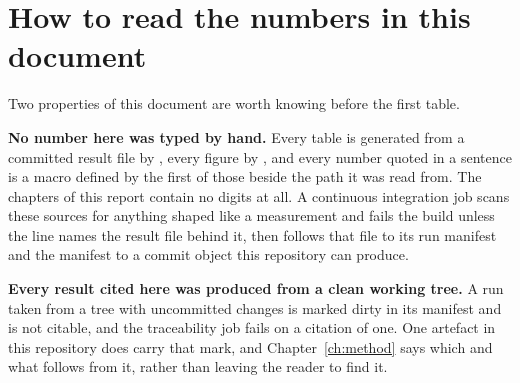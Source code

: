 \section{How to read the numbers in this document}

\syntheticnote

Two properties of this document are worth knowing before the first table.

\textbf{No number here was typed by hand.} Every table is generated from a
committed result file by , every figure by
, and every number quoted in a sentence
is a macro defined by the first of those beside the path it was read from. The
chapters of this report contain no digits at all. A continuous integration job
scans these sources for anything shaped like a measurement and fails the build
unless the line names the result file behind it, then follows that file to its
run manifest and the manifest to a commit object this repository can produce.

\textbf{Every result cited here was produced from a clean working tree.} A run
taken from a tree with uncommitted changes is marked dirty in its manifest and
is not citable, and the traceability job fails on a citation of one. One
artefact in this repository does carry that mark, and Chapter~\ref{ch:method}
says which and what follows from it, rather than leaving the reader to find it.

